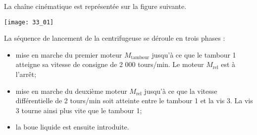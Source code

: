 \normaltrue \difficilefalse \tdifficilefalse
\correctiontrue


\setcounter{question}{0}%

\ifcorrection
\else
{}
\fi

\ifprof
\else

La chaîne cinématique est représentée sur la figure
suivante.
\begin{marginfigure}
\texttt{[image: 33\_01]}
\end{marginfigure}


La séquence de lancement de la centrifugeuse se déroule en trois phases :
\begin{itemize}
\item mise en marche du premier moteur $M_{\text{tambour}}$ jusqu’à ce que le tambour 1 atteigne sa vitesse
de consigne de 2 000 tours/min. Le moteur $M_{\text{rel}}$ est à l’arrêt;
\item mise en marche du deuxième moteur $M_{\text{rel}}$ jusqu’à ce que la vitesse différentielle de
2 tours/min soit atteinte entre le tambour 1 et la vis 3. La vis 3 tourne ainsi plus vite que le
tambour 1;
\item la boue liquide est ensuite introduite.
\end{itemize}
\fi


\ifprof
\else
\fi

\ifprof
\else


\fi